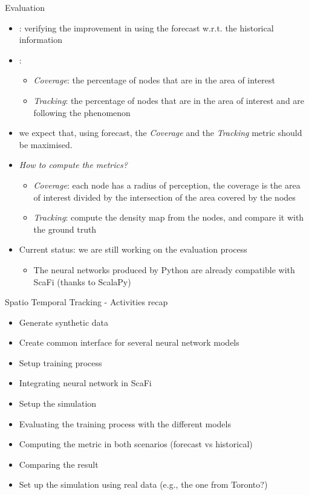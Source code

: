 \documentclass[presentation, 9pt]{beamer}\mode<presentation>{\usetheme{AMSBolognaFC}}
\begin{document}
\begin{frame}{Evaluation}
	\begin{itemize}
		\item {}: verifying the improvement in using the forecast w.r.t. the historical information
		\item {}:
		\begin{itemize}
			\item \emph{Coverage}: the percentage of nodes that are in the area of interest
			\item \emph{Tracking}: the percentage of nodes that are in the area of interest and are following the phenomenon
		\end{itemize}
		\item we expect that, using forecast, the \emph{Coverage} and the \emph{Tracking} metric should be maximised.
		\item \emph{How to compute the metrics?}
		\begin{itemize}
			\item \emph{Coverage}: each node has a radius of perception, the coverage is the area of interest divided by the intersection of the area covered by the nodes
			\item \emph{Tracking}: compute the density map from the nodes, and compare it with the ground truth
		\end{itemize}
		\item Current status: we are still working on the evaluation process
		\begin{itemize}
			\item The neural networks produced by Python are already compatible with ScaFi (thanks to ScalaPy)
		\end{itemize}
	\end{itemize}
\end{frame}
\begin{frame}{Spatio Temporal Tracking - Activities recap}
\begin{itemize}
	\item[{\textcolor{darkcyan}\faThumbsUp}] Generate synthetic data
	\item[{\textcolor{darkcyan}\faThumbsUp}] Create common interface for several neural network models
	\item[{\textcolor{darkcyan}\faThumbsUp}] Setup training process
	\item[{\textcolor{darkcyan}\faThumbsUp}] Integrating neural network in ScaFi
	\item[{\textcolor{darkcyan}\faThumbsUp}] Setup the simulation 
	\item[\faQuestion] Evaluating the training process with the different models
	\item[\faThumbsDown] Computing the metric in both scenarios (forecast vs historical)
	\item[\faThumbsDown] Comparing the result
	\item[\faQuestion] Set up the simulation using real data (e.g., the one from Toronto?)
\end{itemize}
\end{frame}
\end{document}
